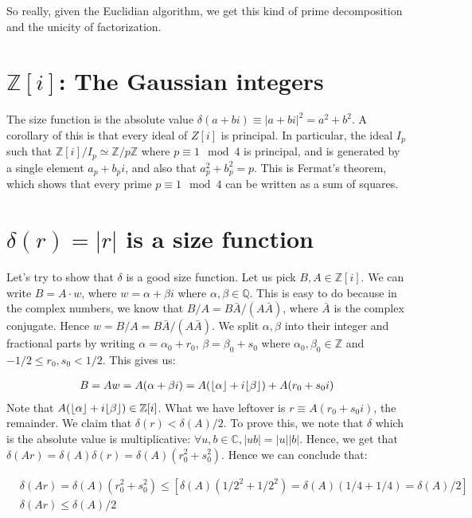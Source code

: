 \documentclass{book}
\newcommand{\Z}{\ensuremath{\mathbb{Z}}}
\newcommand{\Q}{\ensuremath{\mathbb{Q}}}
\newcommand{\C}{\ensuremath{\mathbb{C}}}
\DeclarePairedDelimiter\floor{\lfloor}{\rfloor}
\theoremstyle{definition}
\begin{document}
So really, given the Euclidian algorithm, we get this kind of prime decomposition
and the unicity of factorization.

\section{$\Z[i]$: The Gaussian integers}
The size function is the absolute value $\delta(a+bi) \equiv |a+bi|^2 = a^2 + b^2$.
A corollary of this is that every ideal of $Z[i]$ is principal. In particular,
the ideal $I_p$ such that $\Z[i]/I_p \simeq \Z/p\Z$ where $p \equiv 1 \mod 4$ is
principal, and is generated by a single element $a_p + b_p i$, and also that
$a_p^2 + b_p^2 = p$. This is Fermat's theorem, which shows that every
prime $p \equiv 1 \mod 4$ can be written as a sum of squares.

\section{$\delta(r) = |r|$ is a size function}

Let's try to show that $\delta$ is a good size function. Let us pick $B, A \in \Z[i]$.
We can write $B = A \cdot w$, where $w = \alpha + \beta i$ where $\alpha, \beta \in \Q$.
This is easy to do because in the complex numbers, we know that $B/A = B\bar{A}/(A\bar{A})$,
where $\bar A$ is the complex conjugate.  Hence $w = B/A = B\bar{A}/(A\bar{A})$.
We split $\alpha, \beta$ into their integer and fractional parts by
writing $\alpha = \alpha_0 + r_0$, $\beta = \beta_0 + s_0$ where
$\alpha_0, \beta_0 \in \Z$ and $-1/2 \leq r_0, s_0 < 1/2$. This gives us:

\begin{align*}
B = Aw = A(\alpha + \beta i) = A(\floor{\alpha} + i \floor \beta) + A(r_0 + s_0 i) \\
\end{align*}
Note that $A(\floor{\alpha} + i \floor \beta) \in \Z[i]$. What
we have leftover is $r \equiv A(r_0 + s_0 i)$, the remainder. 
We claim that $\delta(r) < \delta(A)/2$. To prove this, we note that $\delta$
which is the absolute value is multiplicative: $\forall u, b \in \C, |ub| = |u||b|$.
Hence, we get that $\delta(Ar) = \delta(A)\delta(r) = \delta(A)(r_0^2 + s_0^2)$.
Hence we can conclude that:

\begin{align*}
& \delta(Ar) = \delta(A)(r_0^2 + s_0^2) \leq \left[ \delta(A)(1/2^2 + 1/2^2) = \delta(A)(1/4 + 1/4) = \delta(A)/2 \right] \\
& \delta(Ar) \leq \delta(A)/2
\end{align*}
\end{document}
